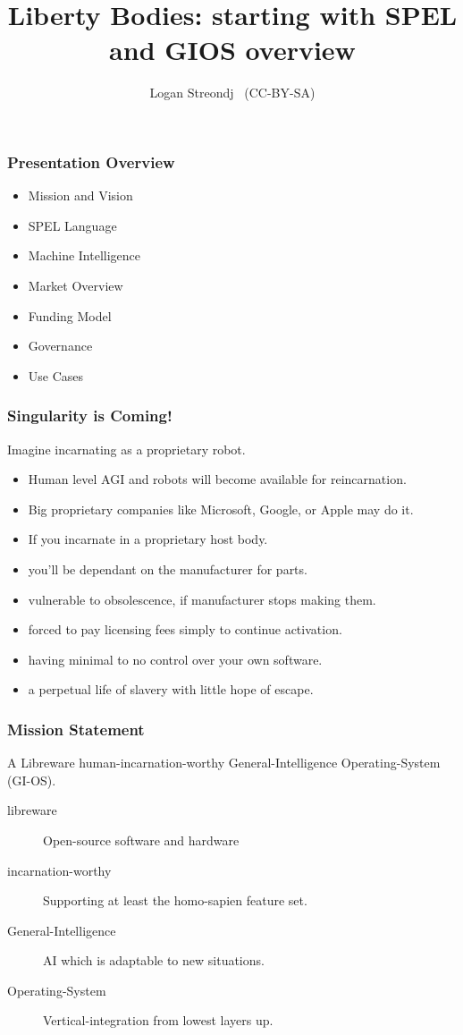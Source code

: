 \documentclass{beamer}
\title{Liberty Bodies: starting with SPEL and GIOS overview}
\author{Logan Streondj \
          (CC-BY-SA)}
\begin{document}
\begin{frame}
\titlepage
\end{frame}

\begin{frame}
\frametitle{Presentation Overview}
  \begin{itemize}
    \item Mission and Vision
    \item SPEL Language 
    \item Machine Intelligence 
    \item Market Overview
    \item Funding Model
    \item Governance
    \item Use Cases
  \end{itemize}
\end{frame}


\begin{frame}
  \frametitle{Singularity is Coming!}
  Imagine incarnating as a proprietary robot.
  \begin{itemize}
    \item Human level AGI and robots will become available for reincarnation.
    \item Big proprietary companies like Microsoft, Google, or Apple may do it.
    \item If you incarnate in a proprietary host body.
    \item you'll be dependant on the manufacturer for parts.
    \item vulnerable to obsolescence, if manufacturer stops making them.
    \item forced to pay licensing fees simply to continue activation. 
    \item having minimal to no control over your own software. 
    \item a perpetual life of slavery with little hope of escape. 
  \end{itemize}
\end{frame}

\begin{frame}
 \frametitle{Mission Statement}
 A Libreware human-incarnation-worthy General-Intelligence Operating-System (GI-OS).
 \begin{description}
    \item[libreware] Open-source software and hardware
    \item[incarnation-worthy] Supporting at least the homo-sapien feature set. 
    \item[General-Intelligence] AI which is adaptable to new situations. 
    \item[Operating-System] Vertical-integration from lowest layers up. 
  \end{description}
\end{frame}
\end{document}
